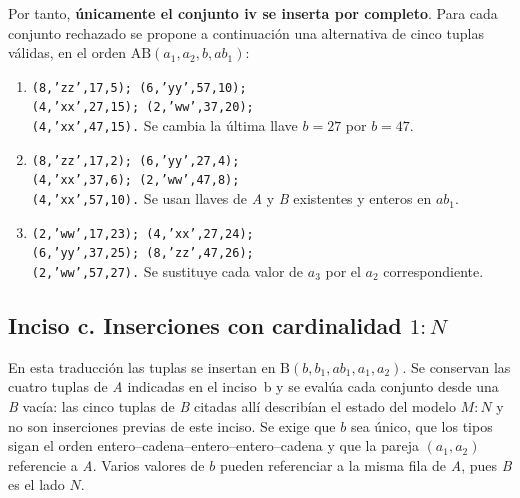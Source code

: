 Por tanto, \textbf{únicamente el conjunto iv se inserta por completo}.
Para cada conjunto rechazado se propone a continuación una alternativa de
cinco tuplas válidas, en el orden
$\mathrm{AB}(a_1,a_2,b,ab_1)$:

\begin{enumerate}[label=\roman*.,leftmargin=*,itemsep=0.2em]
  \item \texttt{(8,'zz',17,5); (6,'yy',57,10);}\\
    \texttt{(4,'xx',27,15); (2,'ww',37,20);}\\
    \texttt{(4,'xx',47,15).}
    Se cambia la última llave $b=27$ por $b=47$.
  \item \texttt{(8,'zz',17,2); (6,'yy',27,4);}\\
    \texttt{(4,'xx',37,6); (2,'ww',47,8);}\\
    \texttt{(4,'xx',57,10).}
    Se usan llaves de \emph{A} y \emph{B} existentes y enteros en $ab_1$.
  \item \texttt{(2,'ww',17,23); (4,'xx',27,24);}\\
    \texttt{(6,'yy',37,25); (8,'zz',47,26);}\\
    \texttt{(2,'ww',57,27).}
    Se sustituye cada valor de $a_3$ por el $a_2$ correspondiente.
\end{enumerate}

\subsection{Inciso c. Inserciones con cardinalidad $1:N$}

En esta traducción las tuplas se insertan en
$\mathrm{B}(b,b_1,ab_1,a_1,a_2)$. Se conservan las cuatro tuplas de
\emph{A} indicadas en el inciso~b y se evalúa cada conjunto desde una
\emph{B} vacía: las cinco tuplas de \emph{B} citadas allí describían el
estado del modelo $M:N$ y no son inserciones previas de este inciso.
Se exige que $b$ sea único, que los tipos sigan el orden
entero--cadena--entero--entero--cadena y que la pareja $(a_1,a_2)$
referencie a \emph{A}. Varios valores de $b$ pueden referenciar a la misma
fila de \emph{A}, pues \emph{B} es el lado $N$.

